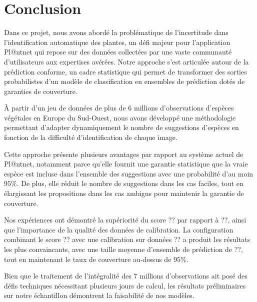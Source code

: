 \documentclass[a4paper,12pt]{article}
\begin{document}

\section{Conclusion}

Dans ce projet, nous avons abordé la problématique de l'incertitude dans l'identification automatique des plantes, un défi majeur pour l'application Pl@ntnet qui repose sur des données collectées par une vaste communauté d'utilisateurs aux expertises avérées. Notre approche s'est articulée autour de la prédiction conforme, un cadre statistique qui permet de transformer des sorties probabilistes d'un modèle de classification en ensembles de prédiction dotés de garanties de couverture.

\vspace{0.2cm}

À partir d'un jeu de données de plus de $6$ millions d'observations d'espèces végétales en Europe du Sud-Ouest, nous avons développé une méthodologie permettant d'adapter dynamiquement le nombre de suggestions d'espèces en fonction de la difficulté d'identification de chaque image. 

\vspace{0.2cm}

Cette approche présente plusieurs avantages par rapport au système actuel de Pl@ntnet, notamment parce qu'elle fournit une garantie statistique que la vraie espèce est incluse dans l'ensemble des suggestions avec une probabilité d'au moin $95\%$. De plus, elle réduit le nombre de suggestions dans les cas faciles, tout en élargissant les propositions dans les cas ambigus pour maintenir la garantie de couverture.

\vspace{0.2cm}

Nos expériences ont démontré la supériorité du score ?? par rapport à ??, ainsi que l'importance de la qualité des données de calibration. La configuration combinant le score ?? avec une calibration sur données ?? a produit les résultats les plus convaincants, avec une taille moyenne d'ensemble de prédiction de ??, tout en maintenant le taux de couverture au-dessus de $95\%$.

\vspace{0.2cm}

Bien que le traitement de l'intégralité des $7$ millions d'observations ait posé des défis techniques nécessitant plusieurs jours de calcul, les résultats préliminaires sur notre échantillon démontrent la faisabilité de nos modèles.
\end{document}
